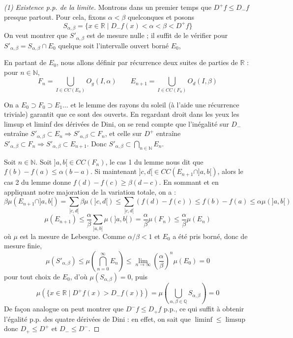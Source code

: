 \documentclass[a4paper, 11pt]{article}
\def\N{\mathbb{N}}
\def\Q{\mathbb{Q}}
\def\R{\mathbb{R}}
\begin{document}
\begin{proof}[(1) Existence p.p. de la limite]
Montrons dans un premier temps que $D^+f \leq D_-f$ presque partout. Pour cela,
fixons $\alpha < \beta$ quelconques et posons
\[ S_{\alpha,\beta} = \{ x \in \R \mid D_-f(x) < \alpha < \beta < D^+f \} \]
On veut montrer que $S'_{\alpha,\beta}$ est de mesure nulle ; il suffit de le
vérifier pour $S'_{\alpha,\beta} = S_{\alpha,\beta} \cap E_0$ quelque soit
l'intervalle ouvert borné $E_0$,

En partant de $E_0$, nous allons définir par récurrence deux suites de parties
de $\R$ : pour $n \in \N$,
\[ F_n = \bigcup_{I \in CC(E_n)} O_g(I, \alpha) \qquad
   E_{n+1} = \bigcup_{I \in CC(F_n)} O_d(I, \beta) \]

On a $E_0 \supset F_0 \supset E_1 \ldots$ et le lemme des rayons du soleil (à
l'aide une récurrence triviale) garantit que ce sont des ouverts. En regardant
droit dans les yeux les limsup et liminf des dérivées de Dini, on se rend compte
que l'inégalité sur $D_-$ entraîne $S'_{\alpha,\beta} \subset E_n \Rightarrow
S'_{\alpha,\beta} \subset F_n$, et celle sur $D^+$ entraîne $S'_{\alpha,\beta}
\subset F_n \Rightarrow S'_{\alpha,\beta} \subset E_{n+1}$. Donc
$S'_{\alpha,\beta} \subset \bigcap_{n \in \N} E_n$.

Soit $n \in \N$. Soit $]a,b[ \in CC(F_n)$, le cas 1 du lemme nous dit que
$f(b) - f(a) \leq \alpha(b-a)$. Si maintenant $]c,d[ \in CC(E_{n+1} \cap
]a,b[)$, alors le cas 2 du lemme donne $f(d)-f(c) \geq \beta(d-c)$. En sommant
et en appliquant notre majoration de la variation totale, on a :
\[ \beta\mu(E_{n+1} \cap ]a,b[) = \sum_{]c,d[} \beta\mu(]c,d[) \leq \sum_{]c,d[}
  (f(d) - f(c)) \leq f(b) - f(a) \leq \alpha\mu(]a,b[) \]
\[ \mu(E_{n+1}) \leq \frac{\alpha}{\beta} \sum_{]a,b[} \mu(]a,b[) =
  \frac{\alpha}{\beta} \mu(F_n) \leq \frac{\alpha}{\beta} \mu(E_n) \] où $\mu$
est la mesure de Lebesgue. Comme $\alpha/\beta < 1$ et $E_0$ a été pris borné,
donc de mesure finie,
\[ \mu(S'_{\alpha,\beta}) \leq \mu \left( \bigcap_{n=0}^\infty E_n \right)
  \leq \lim_{n \to \infty} \left( \frac{\alpha}{\beta} \right)^n \mu(E_0) = 0 \]
pour tout choix de $E_0$, d'où $\mu(S_{\alpha,\beta}) = 0$, puis
\[ \mu\left( \{x \in \R \mid  D^+f(x) > D_-f(x) \} \right)
  = \mu\left( \bigcup_{\alpha, \beta \in \Q} S_{\alpha,\beta} \right)
  = 0 \]
De façon analogue on peut montrer que $D^-f \leq D_+f$ p.p., ce qui suffit à
obtenir l'égalité p.p. des quatre dérivées de Dini : en effet, on sait que
$\liminf \leq \limsup$ donc $D_+ \leq D^+$ et $D_- \leq D^-$.
\end{proof}
\end{document}
